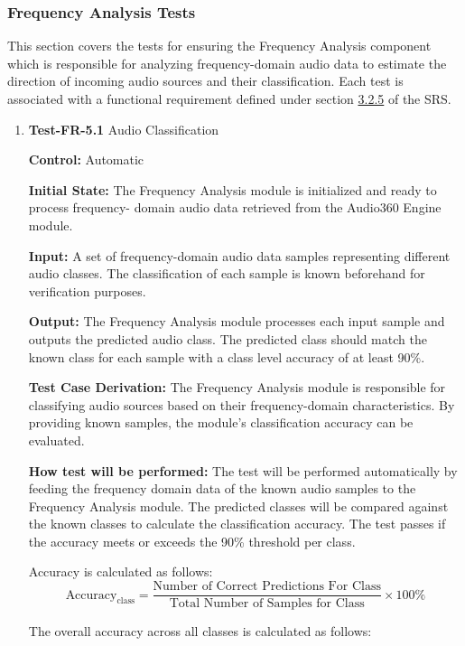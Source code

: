 \documentclass[12pt, titlepage]{article}
\begin{document}
\subsubsection{Frequency Analysis Tests}

This section covers the tests for ensuring the Frequency Analysis component
which is responsible for analyzing frequency-domain audio data to estimate the
direction of incoming audio sources and their classification. Each test is
associated with a functional requirement defined under section
\hyperref[SRS-sec:FR5]{3.2.5} of the SRS.
\begin{enumerate}

\label{sec:freq-analysis-tests}
\item{\textbf{Test-FR-5.1} Audio Classification\\}

\textbf{Control:} Automatic

\textbf{Initial State:}
The Frequency Analysis module is initialized and ready to process frequency-
domain audio data retrieved from the Audio360 Engine module. 

\textbf{Input:}
A set of frequency-domain audio data samples representing different audio
classes. The classification of each sample is known beforehand for verification
purposes.

\textbf{Output:}
The Frequency Analysis module processes each input sample and outputs the
predicted audio class. The predicted class should match the known class for each
sample with a class level accuracy of at least 90\%.

\textbf{Test Case Derivation:}
The Frequency Analysis module is responsible for classifying audio sources based
on their frequency-domain characteristics. By providing known samples, the
module's classification accuracy can be evaluated.

\textbf{How test will be performed:}
The test will be performed automatically by feeding the frequency domain data of
the known audio samples to the Frequency Analysis module. The predicted classes
will be compared against the known classes to calculate the classification
accuracy. The test passes if the accuracy meets or exceeds the 90\% threshold
per class.

Accuracy is calculated as follows:
\[
\text{Accuracy}_{\text{class}} = \frac{\text{Number of Correct Predictions For 
Class}}{\text{Total Number of Samples for Class}} \times 100\%
\]

The overall accuracy across all classes is calculated as follows:


\end{enumerate}
\end{document}
